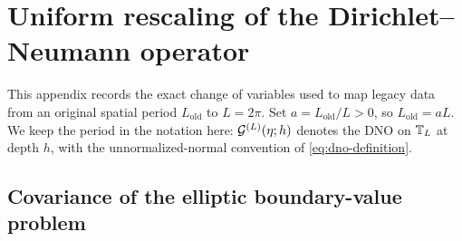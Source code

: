 \section{Uniform rescaling of the Dirichlet--Neumann operator}
\label{app:rescaling}

This appendix records the exact change of variables used to map legacy data
from an original spatial period \(L_{\mathrm{old}}\) to \(L=2\pi\). Set
\(a=L_{\mathrm{old}}/L>0\), so \(L_{\mathrm{old}}=aL\). We keep the period in
the notation here: $\mathcal{G}^{(L)}(\eta;h)$ denotes the DNO on $\mathbb{T}_L$ at depth $h$,
with the unnormalized-normal convention of \eqref{eq:dno-definition}.

\subsection{Covariance of the elliptic boundary-value problem}

